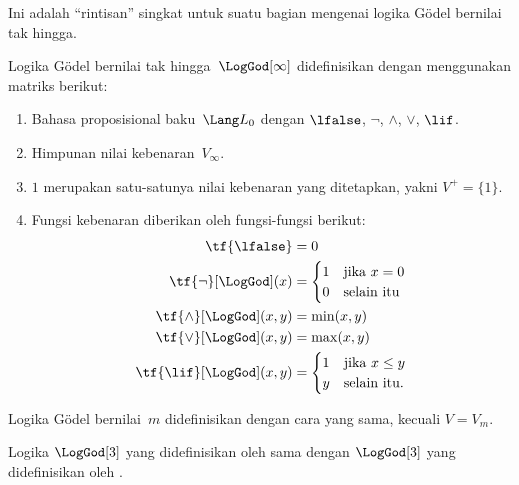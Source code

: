 \documentclass[../../../include/open-logic-section]{subfiles}
\begin{document}


\begin{editorial}
  Ini adalah ``rintisan'' singkat untuk suatu bagian mengenai logika G\"odel
  bernilai tak hingga.
\end{editorial}

\begin{defn} Logika G\"odel bernilai tak
hingga~$\LogGod[\infty]$ didefinisikan dengan menggunakan matriks berikut:
\begin{enumerate}
  \item Bahasa proposisional baku~$\Lang L_0$ dengan
  $\lfalse$, $\lnot$, $\land$, $\lor$, $\lif$.
  \item Himpunan nilai kebenaran~$V_\infty$.
  \item $1$ merupakan satu-satunya nilai kebenaran yang ditetapkan, yakni
  $V^+ = \{1\}$.
  \item Fungsi kebenaran diberikan oleh fungsi-fungsi berikut:
  \begin{align*}
    \tf{\lfalse} & = 0\\
    \tf{\lnot}[\LogGod](x) & = \begin{cases}
      1 & \text{jika } x =0\\
      0 & \text{selain itu}
    \end{cases}\\
    \tf{\land}[\LogGod](x,y) & = \min(x,y)\\
    \tf{\lor}[\LogGod](x,y) & = \max(x,y)\\
    \tf{\lif}[\LogGod](x,y) & = \begin{cases}
      1 & \text{jika } x \le y\\
      y & \text{selain itu.}
    \end{cases}
    \end{align*}
\end{enumerate}
Logika G\"odel bernilai~$m$ didefinisikan dengan cara yang sama, kecuali
$V = V_m$.
\end{defn}

\begin{prop}
  Logika $\LogGod[3]$ yang didefinisikan oleh
   sama dengan $\LogGod[3]$ yang didefinisikan
  oleh .
\end{prop}
\end{document}
